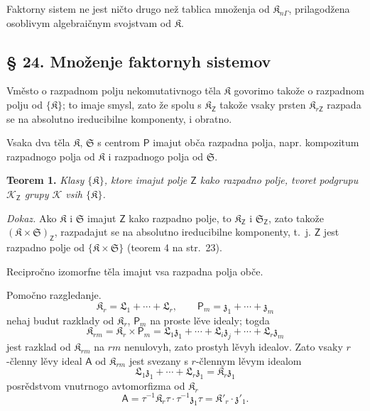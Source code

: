 \documentclass[11pt]{article}
\begin{document}
Faktorny sistem ne jest ničto drugo než tablica množenja od \(\mathfrak K_{n\Gamma}\), prilagodžena osoblivym algebraičnym svojstvam od \(\mathfrak K\).

\subsection*{§ 24. Množenje faktornyh sistemov}\label{multiplikation-von-faktorensystemen}

Vměsto o razpadnom polju nekomutativnogo těla \(\mathfrak K\) govorimo takože o razpadnom polju od \(\{\mathfrak K\}\); to imaje smysl, zato že spolu s \(\mathfrak K_{\mathsf{Z}}\) takože vsaky prsten \(\mathfrak K_{r\mathsf{Z}}\) razpada se na absolutno ireducibilne komponenty, i obratno.

Vsaka dva těla \(\mathfrak K\), \(\mathfrak S\) s centrom \(\mathsf P\) imajut obča razpadna polja, napr. kompozitum razpadnogo polja od \(\mathfrak K\) i razpadnogo polja od \(\mathfrak S\).

\textbf{Teorem 1.} \emph{Klasy \(\{\mathfrak K\}\), ktore imajut polje \(\mathsf{Z}\) kako razpadno polje, tvoret podgrupu \(\mathscr K_{\mathsf{Z}}\) grupy \(\mathscr K\) vsih \(\{\mathfrak K\}\).}

\emph{Dokaz.} Ako \(\mathfrak K\) i \(\mathfrak S\) imajut \(\mathsf{Z}\) kako razpadno polje, to \(\mathfrak K_{\mathsf{Z}}\) i \(\mathfrak S_{\mathsf{Z}}\), zato takože \((\mathfrak K\times\mathfrak S)_{\mathsf{Z}}\), razpadajut se na absolutno ireducibilne komponenty, t.~j. \(\mathsf{Z}\) jest razpadno polje od \(\{\mathfrak K\times\mathfrak S\}\) (teorem 4 na str.~23).

Recipročno izomorfne těla imajut vsa razpadna polja obče.

Pomočno razgledanje.
\[
\mathfrak K_r=\mathfrak L_1+\cdots+\mathfrak L_r,\qquad
\mathsf P_m=\mathfrak z_1+\cdots+\mathfrak z_m
\]
nehaj budut razklady od \(\mathfrak K_r\), \(\mathsf P_m\) na proste lěve idealy; togda
\[
\mathfrak K_{rm}=\mathfrak K_r\times\mathsf P_m
=\mathfrak L_1\mathfrak z_1+\cdots+\mathfrak L_i\mathfrak z_j+\cdots+\mathfrak L_r\mathfrak z_m
\]
jest razklad od \(\mathfrak K_{rm}\) na \(rm\) nenulovyh, zato prostyh lěvyh idealov. Zato vsaky \(r\)-členny lěvy ideal \(\mathsf{A}\) od \(\mathfrak K_{rm}\) jest svezany s \(r\)-člennym lěvym idealom
\[
\mathfrak L_1\mathfrak z_1+\cdots+\mathfrak L_r\mathfrak z_1=\mathfrak K_r\mathfrak z_1
\]
posrědstvom vnutrnogo avtomorfizma od \(\mathfrak K_r\)
\[
\mathsf{A}=\tau^{-1}\mathfrak K_r\tau\cdot\tau^{-1}\mathfrak z_1\tau
=\mathfrak K'_r\cdot\mathfrak z'_1.
\]
\end{document}
